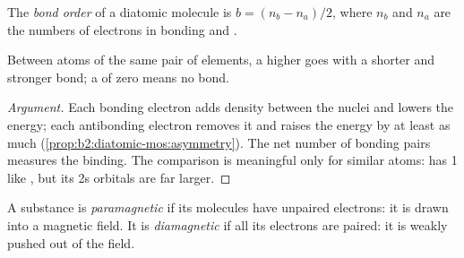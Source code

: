 \begin{definition}\label{def:b2:diatomic-mos:bond-order}
The \emph{bond order} of a diatomic molecule is $b = (n_b -
n_a)/2$, where $n_b$ and $n_a$ are the numbers of electrons in bonding and
.
\end{definition}

\begin{proposition}\label{prop:b2:diatomic-mos:bond-order}
Between atoms of the same pair of elements, a higher  goes with a
shorter and stronger bond; a  of zero means no bond.
\end{proposition}

\begin{proof}[Argument]
Each bonding electron adds density between the nuclei and lowers the energy;
each antibonding electron removes it and raises the energy by at least as much
(\cref{prop:b2:diatomic-mos:asymmetry}). The net number of bonding pairs measures
the binding. The comparison is meaningful only for similar atoms:  has
 1 like , but its 2s orbitals are far larger.
\end{proof}

\begin{definition}\label{def:b2:diatomic-mos:magnetism}
A substance is \emph{paramagnetic} if its molecules have
unpaired electrons: it is drawn into a magnetic field. It is
\emph{diamagnetic} if all its electrons are paired: it is
weakly pushed out of the field.
\end{definition}

